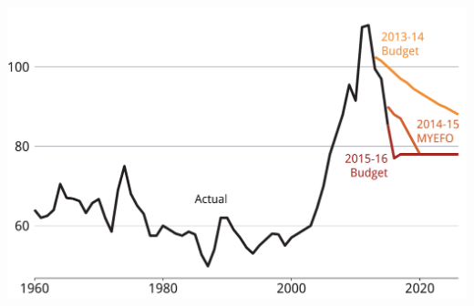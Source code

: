 \documentclass[tikz]{standalone}\usepackage[]{graphicx}\usepackage[]{color}
\newenvironment{knitrout}{}{} %
\begin{document}
\begin{knitrout}
\color{fgcolor}
\includegraphics[width=11.000in,height=7.00in]{./b5-figure/FISCAL-Figure7-1} 

\end{knitrout}
\end{document}
